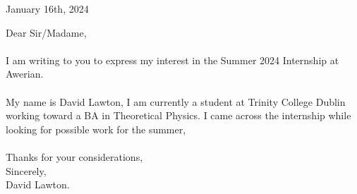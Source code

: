 \documentclass{letter}
\begin{document}
\begin{flushright}
January 16th, 2024
\end{flushright}
\vspace{2cm}
Dear Sir/Madame,\\
\vspace{0.5cm}\\
I am writing to you to express my interest in the Summer 2024 Internship at Awerian.\\
\vspace{0.5cm}\\
My name is David Lawton, I am currently a student at Trinity College Dublin working toward a BA in Theoretical Physics. I came across the internship while looking for possible work for the summer, \\
\vspace{0.5cm}\\
Thanks for your considerations,\\
Sincerely,\\
David Lawton.\\
\end{document}

